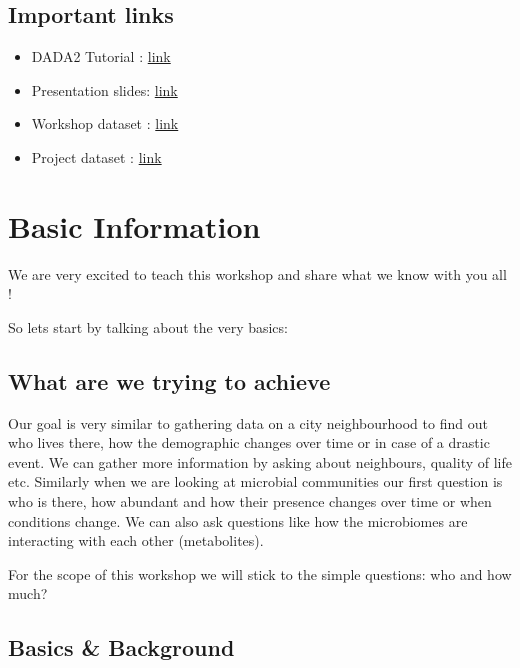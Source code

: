 \documentclass[
]{book}
\providecommand{\tightlist}{%
  \setlength{\itemsep}{0pt}\setlength{\parskip}{0pt}}
\begin{document}
\hypertarget{important-links}{%
\section{Important links}\label{important-links}}

\begin{itemize}
\tightlist
\item
  DADA2 Tutorial : \href{http://benjjneb.github.io/dada2/tutorial.html}{link}
\item
  Presentation slides: \href{new_microbiomeworkshop.pdf}{link}
\item
  Workshop dataset : \href{MiSeqSOPData.zip}{link}
\item
  Project dataset : \href{https://www.dropbox.com/sh/1oy9upgzxlsra9y/AAANkbCj36lvP6vEQucE7fYna?dl=0}{link}
\end{itemize}

\hypertarget{basic-information}{%
\chapter{Basic Information}\label{basic-information}}

We are very excited to teach this workshop and share what we know with you all !

So lets start by talking about the very basics:

\hypertarget{what-are-we-trying-to-achieve}{%
\section{What are we trying to achieve}\label{what-are-we-trying-to-achieve}}

Our goal is very similar to gathering data on a city neighbourhood to find out who lives there, how the demographic changes over time or in case of a drastic event. We can gather more information by asking about neighbours, quality of life etc. Similarly when we are looking at microbial communities our first question is who is there, how abundant and how their presence changes over time or when conditions change. We can also ask questions like how the microbiomes are interacting with each other (metabolites).

For the scope of this workshop we will stick to the simple questions: who and how much?

\hypertarget{basics-background}{%
\section{Basics \& Background}\label{basics-background}}
\end{document}
